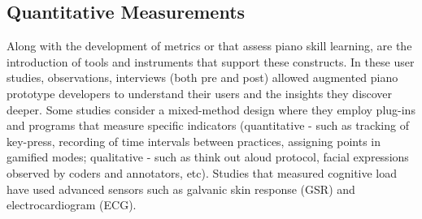 \documentclass[sigconf, screen, review]{acmart}
\begin{document}
\subsection{Quantitative Measurements}

Along with the development of metrics or that assess piano skill learning, are the introduction of tools and instruments that support these constructs. In these user studies, observations, interviews (both pre and post) allowed augmented piano prototype developers to understand their users and the insights they discover deeper. Some studies consider a mixed-method design where they employ plug-ins and programs that measure specific indicators (quantitative - such as tracking of key-press, recording of time intervals between practices, assigning points in gamified modes; qualitative - such as think out aloud protocol, facial expressions observed by coders and annotators, etc). Studies that measured cognitive load have used advanced sensors such as galvanic skin response (GSR) and electrocardiogram (ECG). 
\end{document}
